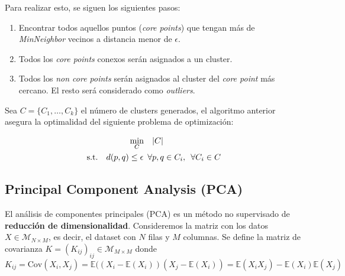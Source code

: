 Para realizar esto, se siguen los siguientes pasos: 

\begin{enumerate}
    \item Encontrar todos aquellos puntos (\textit{core points}) que tengan más de \textit{MinNeighbor} vecinos a distancia menor de $\epsilon$. 
    \item Todos los \textit{core points} conexos serán asignados a un cluster. 
    \item Todos los \textit{non core points} serán asignados al cluster del \textit{core point} más cercano. El resto será considerado como \textit{outliers}. 
\end{enumerate}

Sea $C = \{ C_1 , \dots , C_{k} \}$ el número de clusters generados, el algoritmo anterior asegura la optimalidad del siguiente problema de optimización: 

\begin{equation*}
\begin{aligned}
\min_{C} \quad &|C| \\
\textrm{s.t.} \quad d(p,q) \leq \epsilon \hspace{0.5em} \forall &p,q \in C_i, \hspace{0.5em} \forall C_i \in C
\end{aligned}
\end{equation*}

\subsection{Principal Component Analysis (PCA)}

El análisis de componentes principales (PCA) es un método no supervisado de \textbf{reducción de dimensionalidad}. Consideremos la matriz con los datos $X \in \mathcal{M}_{N \times M}$, es decir, el dataset con $N$ filas y $M$ columnas. Se define la matriz de covarianza $K = (K_{ij})_{ij} \in \mathcal{M}_{M \times M}$ donde  
$$K_{ij} = \text{Cov}(X_i, X_j) = \mathbb{E}((X_i - \mathbb{E}(X_i))(X_j - \mathbb{E}(X_i)) = \mathbb{E}(X_iX_j) - \mathbb{E}(X_i)\mathbb{E}(X_j)$$

